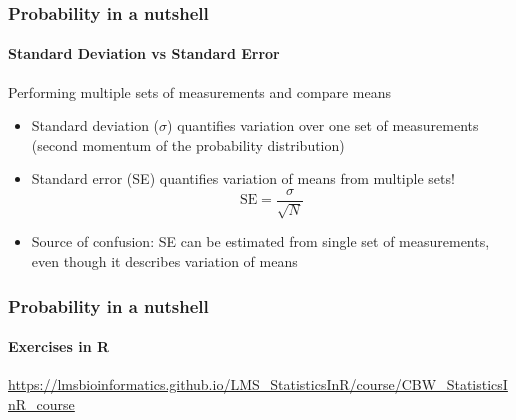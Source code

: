 \documentclass[aspectratio=43]{beamer}
\begin{document}
\begin{frame}

	\frametitle{Probability in a nutshell}
	\framesubtitle{Standard Deviation vs Standard Error}
	
	\footnotesize

	Performing multiple sets of measurements and compare means
	
	\begin{itemize}
		\item Standard deviation ($\sigma$) quantifies variation over one set of measurements (second momentum of the probability distribution)
		\item Standard error (SE) quantifies {\color{red}variation of means from multiple sets!}
		\begin{equation}
		\textrm{SE} = \frac{\sigma}{\sqrt{N}} \nonumber
		\end{equation}
		\item Source of confusion: SE can be estimated from single set of measurements, even though it describes variation of means
	\end{itemize}

\end{frame}

\begin{frame}
	
	\frametitle{Probability in a nutshell}
	\framesubtitle{Exercises in R}
	
	\footnotesize

	\href{https://lmsbioinformatics.github.io/LMS_StatisticsInR/course/CBW_StatisticsInR_course.html}{https://lmsbioinformatics.github.io/LMS\_StatisticsInR/course/CBW\_StatisticsInR\_course}

\end{frame}

%
%

\begin{frame}


\end{frame}
\end{document}
